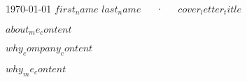 \documentclass[11pt, a4paper]{awesome-cv}
\begin{document}
\makecvheader[R]

\makecvfooter
  {\today}
  {$first_name$ $last_name$~~~·~~~$cover_letter_title$}
  {}

\makelettertitle

\begin{cvletter}

$about_me_content$

$why_company_content$

$why_me_content$

\end{cvletter}


\makeletterclosing
\end{document}
